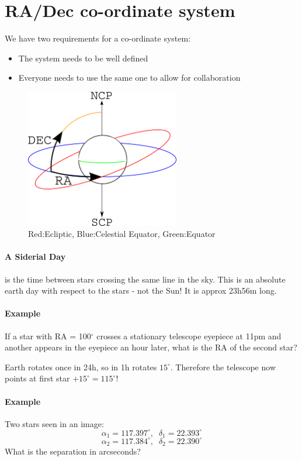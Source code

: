 \section{RA/Dec co-ordinate system}

We have two requirements for a co-ordinate system:
\begin{itemize}
	\item The system needs to be well defined
	\item Everyone needs to use the same one to allow for collaboration
\end{itemize}

\begin{figure}[h!]
	\centering
	\includegraphics[width=0.6\textwidth]{RaDecDrawing.png}
	\caption{Red:Ecliptic, Blue:Celestial Equator, Green:Equator}
\end{figure}

\paragraph{A Siderial Day} is the time between stars crossing the same line in
the sky. This is an absolute earth day with respect to the stars - not the Sun!
It is approx 23h56m long.

\paragraph{Example}
If a star with RA = 100$^\circ$ crosses a stationary telescope eyepiece at 11pm
and another appears in the eyepiece an hour later, what is the RA of the second
star?

Earth rotates once in 24h, so in 1h rotates $15^\circ$. Therefore the telescope
now points at first star $ + 15^\circ = 115^\circ$!

\paragraph{Example}
Two stars seen in an image:
$$
	\alpha_1 = 117.397^\circ, \; \; \delta_1 = 22.393^\circ
$$
$$
	\alpha_2 = 117.384^\circ, \; \; \delta_2 = 22.390^\circ
$$
What is the separation in arcseconds?

